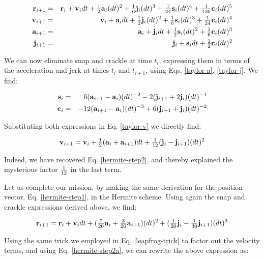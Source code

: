 \begin{eqnarray}
\br_{i+1} & = & \br_i + \bv_i dt + \half\ba_{i}(dt)^2 + \one{6}\bj_{i}(dt)^3
                      + \one{24}\bs_{i}(dt)^4 + \one{120}\bc_{i}(dt)^5
                                                           \label{taylor-r} \\
\bv_{i+1} & = & \bv_i + \ba_i dt + \half\bj_{i}(dt)^2 + \one{6}\bs_{i}(dt)^3
                      + \one{24}\bc_{i}(dt)^4              \label{taylor-v} \\
\ba_{i+1} & = & \ba_i + \bj_i dt + \half\bs_{i}(dt)^2 + \one{6}\bc_{i}(dt)^3
                                                           \label{taylor-a} \\
\bj_{i+1} & = & \bj_i + \bs_i dt + \half\bc_{i}(dt)^2      \label{taylor-j}
\end{eqnarray}

\noindent
We can now eliminate snap and crackle at time $t_i$, expressing them
in terms of the acceleration and jerk at times $t_i$ and $t_{i+1}$,
using Eqs. \ref{taylor-a}, \ref{taylor-j}.  We find:

\begin{eqnarray}
{\bf s}_i &=& 6({\bf a}_{i+1} -{\bf a}_{i})(dt)^{-2} -2({\bf j}_{i+1} +2{\bf j}_{i})(dt)^{-1} \\
{\bf c}_i &=& -12({\bf a}_{i+1} -{\bf a}_{i})(dt)^{-3} +6({\bf j}_{i+1} +{\bf j}_{i})(dt)^{-2}
\end{eqnarray}

\noindent
Substituting both expressions in Eq. \ref{taylor-v} we directly find:

\begin{equation}
\bv_{i+1} = \bv_i + \half(\ba_i + \ba_{i+1}) dt +
                \one{12}(\bj_i - \bj_{i+1})(dt)^2 \label{hermite-step2a}
\end{equation}

\noindent
Indeed, we have recovered Eq. \ref{hermite-step2}, and thereby
explained the mysterious factor ${\textstyle\frac{1}{12}}$ in the last term.

Let us complete our mission, by making the same derivation for 
the position vector, Eq. \ref{hermite-step1}, in the Hermite scheme.
Using again the snap and crackle expressions derived above, we find:

\begin{equation}
{\bf r}_{i+1} = {\bf r}_i + {\bf v}_i dt + ({\textstyle\frac{7}{20}}{\bf a}_i + {\textstyle\frac{3}{20}}{\bf a}_{i+1})(dt)^2
            + ({\textstyle\frac{1}{20}}{\bf j}_i - {\textstyle\frac{1}{30}}{\bf j}_{i+1})(dt)^3
\end{equation}

\noindent
Using the same trick we employed in Eq. \ref{leapfrog-trick} to factor
out the velocity terms, and using Eq. \ref{hermite-step2a}, we can
rewrite the above expression as:

